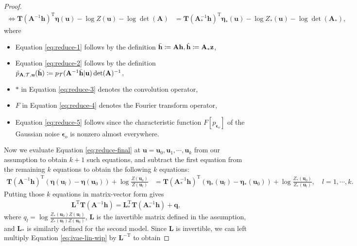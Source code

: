 \documentclass[nohyperref]{article}
\theoremstyle{plain}
\theoremstyle{definition}
\theoremstyle{remark}
\begin{document}
\begin{proof}
\begin{align}
        \iff \mathbf{T}(\mathbf{A}^{-1}\mathbf{h})^{\text{T}}\boldsymbol{\eta}(\mathbf{u})-\log Z(\mathbf{u})-\log\det(\mathbf{A}) &= \mathbf{T}(\mathbf{A}_{*}^{-1}\mathbf{h})^{\text{T}}\boldsymbol{\eta}_{*}(\mathbf{u})-\log Z_*(\mathbf{u})-\log\det(\mathbf{A}_{*}),\label{eq:reduce-final}
    \end{align}
    where
    \begin{itemize}
        \item Equation \eqref{eq:reduce-1} follows by the definition $\Bar{\mathbf{h}}\coloneqq\mathbf{A}\mathbf{h},\Hat{\mathbf{h}}\coloneqq\mathbf{A}_{*}\mathbf{z}$,
        \item Equation \eqref{eq:reduce-2} follows by the definition $\Tilde{p}_{\mathbf{A},\mathcal{T},\mathbf{u}}(\Bar{\mathbf{h}})\coloneqq p_{\mathcal{T}}(\mathbf{A}^{-1}\Bar{\mathbf{h}}|\mathbf{u})\det(\mathbf{A})^{-1}$,
        \item $*$ in Equation \eqref{eq:reduce-3} denotes the convolution operator,
        \item $F$ in Equation \eqref{eq:reduce-4} denotes the Fourier transform operator,
        \item Equation \eqref{eq:reduce-5} follows since the characteristic function $F[p_{\boldsymbol{\epsilon}_o}]$ of the Gaussian noise $\boldsymbol{\epsilon}_o$ is nonzero almost everywhere.
    \end{itemize}
    Now we evaluate Equation \ref{eq:reduce-final} at $\mathbf{u}=\mathbf{u}_0,\mathbf{u}_1,\cdots,\mathbf{u}_k$ from our assumption to obtain $k+1$ such equations, and subtract the first equation from the remaining $k$ equations to obtain the following $k$ equations:
    \begin{align}
        \mathbf{T}(\mathbf{A}^{-1}\mathbf{h})^{\text{T}}(\boldsymbol{\eta}(\mathbf{u}_l)-\boldsymbol{\eta}(\mathbf{u}_0))+\log \frac{Z(\mathbf{u}_0)}{Z(\mathbf{u}_l)} &= \mathbf{T}(\mathbf{A}_{*}^{-1}\mathbf{h})^{\text{T}}(\boldsymbol{\eta}_{*}(\mathbf{u}_l)-\boldsymbol{\eta}_{*}(\mathbf{u}_0))+\log \frac{Z_*(\mathbf{u}_0)}{Z_*(\mathbf{u}_l)},\quad l=1,\cdots,k.
    \end{align}
    Putting those $k$ equations in matrix-vector form gives
    \begin{align}
        \mathbf{L}^{\text{T}}\mathbf{T}(\mathbf{A}^{-1}\mathbf{h})=\mathbf{L}_{*}^{\text{T}}\mathbf{T}(\mathbf{A}_{*}^{-1}\mathbf{h}) +\mathbf{q},\label{eq:ivae-lin-wip}
    \end{align}
    where $q_l=\log \frac{Z_*(\mathbf{u}_0)Z(\mathbf{u}_l)}{Z_*(\mathbf{u}_l)Z(\mathbf{u}_0)}$, $\mathbf{L}$ is the invertible matrix defined in the assumption, and $\mathbf{L}_{*}$ is similarly defined for the second model. Since $\mathbf{L}$ is invertible, we can left multiply Equation \eqref{eq:ivae-lin-wip} by $\mathbf{L}^{-\text{T}}$ to obtain

\end{proof}
\end{document}
